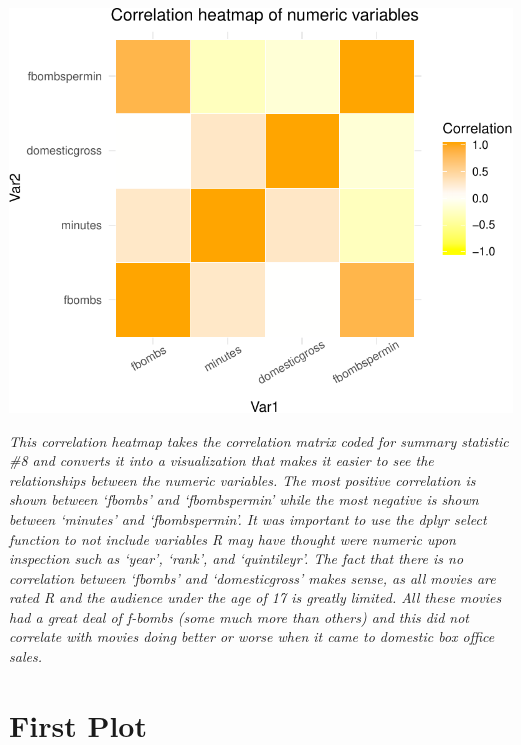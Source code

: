 \documentclass[]{article}
\begin{document}
\begin{center}\includegraphics{project1.ethanpieniazekweb_files/figure-latex/unnamed-chunk-13-1} \end{center}

\emph{This correlation heatmap takes the correlation matrix coded for
summary statistic \#8 and converts it into a visualization that makes it
easier to see the relationships between the numeric variables. The most
positive correlation is shown between `fbombs' and `fbombspermin' while
the most negative is shown between `minutes' and `fbombspermin'. It was
important to use the dplyr select function to not include variables R
may have thought were numeric upon inspection such as `year', `rank',
and `quintileyr'. The fact that there is no correlation between `fbombs'
and `domesticgross' makes sense, as all movies are rated R and the
audience under the age of 17 is greatly limited. All these movies had a
great deal of f-bombs (some much more than others) and this did not
correlate with movies doing better or worse when it came to domestic box
office sales.}

\hypertarget{first-plot}{%
\section{First Plot}\label{first-plot}}
\end{document}

